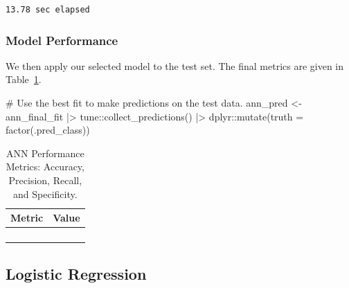 \documentclass[
  letterpaper,
  DIV=11,
  numbers=noendperiod]{scrartcl}
\newenvironment{Shaded}{\begin{snugshade}}{\end{snugshade}}
\newcommand{\AttributeTok}[1]{\textcolor[rgb]{0.40,0.45,0.13}{#1}}
\newcommand{\CommentTok}[1]{\textcolor[rgb]{0.37,0.37,0.37}{#1}}
\newcommand{\FunctionTok}[1]{\textcolor[rgb]{0.28,0.35,0.67}{#1}}
\newcommand{\NormalTok}[1]{\textcolor[rgb]{0.00,0.23,0.31}{#1}}
\newcommand{\OtherTok}[1]{\textcolor[rgb]{0.00,0.23,0.31}{#1}}
\newcommand{\SpecialCharTok}[1]{\textcolor[rgb]{0.37,0.37,0.37}{#1}}
\begin{document}
\begin{verbatim}
13.78 sec elapsed
\end{verbatim}

\subsubsection{Model Performance}\label{model-performance-2}

We then apply our selected model to the test set. The final metrics are
given in Table~\ref{tbl-ann-performance}.

\begin{Shaded}
\begin{Highlighting}[]
\CommentTok{\# Use the best fit to make predictions on the test data.}
\NormalTok{ann\_pred }\OtherTok{\textless{}{-}} 
\NormalTok{  ann\_final\_fit }\SpecialCharTok{|\textgreater{}} 
\NormalTok{  tune}\SpecialCharTok{::}\FunctionTok{collect\_predictions}\NormalTok{() }\SpecialCharTok{|\textgreater{}}
\NormalTok{  dplyr}\SpecialCharTok{::}\FunctionTok{mutate}\NormalTok{(}\AttributeTok{truth =} \FunctionTok{factor}\NormalTok{(.pred\_class))}
\end{Highlighting}
\end{Shaded}

\begin{longtable}{>{\raggedright\arraybackslash}p{}>{\raggedleft\arraybackslash}p{}}

\caption{\label{tbl-ann-performance}ANN Performance Metrics: Accuracy,
Precision, Recall, and Specificity.}

\tabularnewline

\toprule
Metric & Value \\ 
\midrule\addlinespace[2.5pt]
\cellcolor[HTML]{FFFFFF}{Accuracy} & \cellcolor[HTML]{FFFFFF}{92.3} \\ 
\cellcolor[HTML]{FFFFFF}{Precision} & \cellcolor[HTML]{FFFFFF}{84.6} \\ 
\cellcolor[HTML]{FFFFFF}{Recall} & \cellcolor[HTML]{FFFFFF}{88.0} \\ 
\cellcolor[HTML]{FFFFFF}{Specificity} & \cellcolor[HTML]{FFFFFF}{93.9} \\ 
\bottomrule

\end{longtable}

\subsection{Logistic Regression}\label{logistic-regression}
\end{document}
